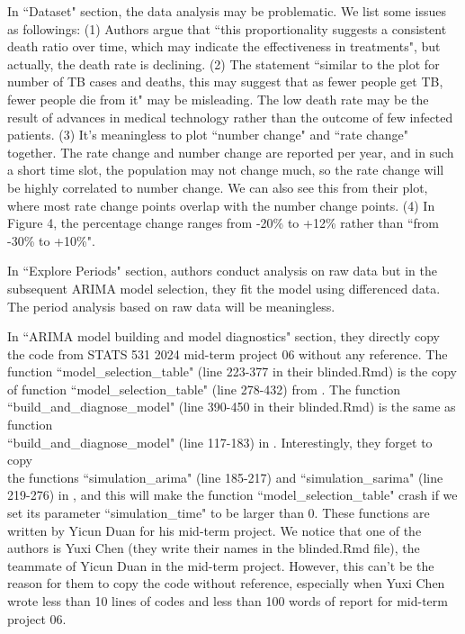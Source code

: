 \documentclass[12pt]{article}
\begin{document}
In ``Dataset" section, the data analysis may be problematic. We list some issues as followings: (1) Authors argue that ``this proportionality suggests a consistent death ratio over time, which may indicate the effectiveness in treatments", but actually, the death rate is declining. (2) The statement ``similar to the plot for number of TB cases and deaths, this may suggest that as fewer people get TB, fewer people die from it" may be misleading. The low death rate may be the result of advances in medical technology rather than the outcome of few infected patients. (3) It's meaningless to plot ``number change" and ``rate change" together. The rate change and number change are reported per year, and in such a short time slot, the population may not change much, so the rate change will be highly correlated to number change. We can also see this from their plot, where most rate change points overlap with the number change points. (4) In Figure 4, the percentage change ranges from -20\% to +12\% rather than ``from -30\% to +10\%".


In ``Explore Periods" section, authors conduct analysis on raw data but in the subsequent ARIMA model selection, they fit the model using differenced data. The period analysis based on raw data will be meaningless.


In ``ARIMA model building and model diagnostics" section, they directly copy the code from STATS 531 2024 mid-term project 06 \cite{2024/proj06} without any reference. The function ``model\_selection\_table" (line 223-377 in their blinded.Rmd) is the copy of function ``model\_selection\_table" (line 278-432) from \cite{2024/proj06}. The function ``build\_and\_diagnose\_model" (line 390-450 in their blinded.Rmd) is the same as function \\ ``build\_and\_diagnose\_model" (line 117-183) in \cite{2024/proj06}. Interestingly, they forget to copy \\ the functions ``simulation\_arima" (line 185-217) and ``simulation\_sarima" (line 219-276) in \cite{2024/proj06}, and this will make the function ``model\_selection\_table" crash if we set its parameter ``simulation\_time" to be larger than 0. These functions are written by Yicun Duan for his mid-term project. We notice that one of the authors is Yuxi Chen (they write their names in the blinded.Rmd file), the teammate of Yicun Duan in the mid-term project. However, this can't be the reason for them to copy the code without reference, especially when Yuxi Chen wrote less than 10 lines of codes and less than 100 words of report for mid-term project 06.
\end{document}
